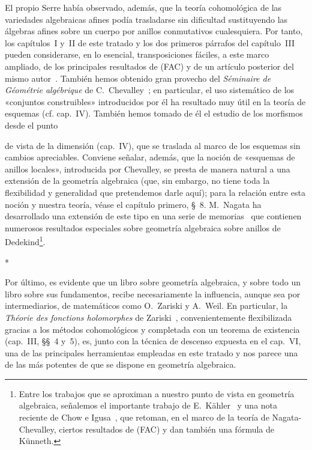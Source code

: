 El propio Serre había observado, además, que la teoría cohomológica de las variedades algebraicas afines podía trasladarse sin dificultad sustituyendo las álgebras afines sobre un cuerpo por anillos conmutativos cualesquiera.
Por tanto, los capítulos~I y~II de este tratado y los dos primeros párrafos del capítulo~III pueden considerarse, en lo esencial, transposiciones fáciles, a este marco ampliado, de los principales resultados de (FAC) y de un artículo posterior del mismo autor~\cite{I-15}.
También hemos obtenido gran provecho del \emph{Séminaire de Géométrie algébrique} de C.~Chevalley~\cite{I-1}; en particular, el uso sistemático de los «conjuntos construibles» introducidos por él ha resultado muy útil en la teoría de esquemas (cf. cap.~IV).
También hemos tomado de él el estudio de los morfismos desde el punto

de vista de la dimensión (cap.~IV), que se traslada al marco de los esquemas sin cambios apreciables.
Conviene señalar, además, que la noción de «esquemas de anillos locales», introducida por Chevalley, se presta de manera natural a una extensión de la geometría algebraica (que, sin embargo, no tiene toda la flexibilidad y generalidad que pretendemos darle aquí); para la relación entre esta noción y nuestra teoría, véase el capítulo primero, \S~8.
M.~Nagata ha desarrollado una extensión de este tipo en una serie de memorias~\cite{I-9} que contienen numerosos resultados especiales sobre geometría algebraica sobre anillos de Dedekind\footnote{Entre los trabajos que se aproximan a nuestro punto de vista en geometría algebraica, señalemos el importante trabajo de E.~Kähler~\cite{I-22} y una nota reciente de Chow e Igusa~\cite{I-3}, que retoman, en el marco de la teoría de Nagata-Chevalley, ciertos resultados de (FAC) y dan también una fórmula de Künneth.}.

\bigskip
\begin{center}*\quad*\quad*\end{center}
\bigskip

Por último, es evidente que un libro sobre geometría algebraica, y sobre todo un libro sobre sus fundamentos, recibe necesariamente la influencia, aunque sea por intermediarios, de matemáticos como O.~Zariski y A.~Weil.
En particular, la \emph{Théorie des fonctions holomorphes} de Zariski~\cite{I-20}, convenientemente flexibilizada gracias a los métodos cohomológicos y completada con un teorema de existencia (cap.~III, \S\S~4 y~5), es, junto con la técnica de descenso expuesta en el cap.~VI, una de las principales herramientas empleadas en este tratado y nos parece una de las más potentes de que se dispone en geometría algebraica.

